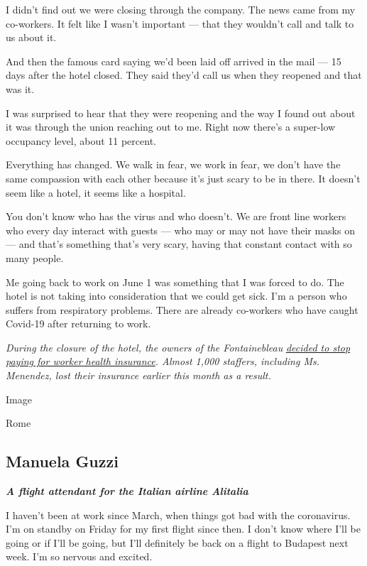 I didn't find out we were closing through the company. The news came
from my co-workers. It felt like I wasn't important --- that they
wouldn't call and talk to us about it.

And then the famous card saying we'd been laid off arrived in the mail
--- 15 days after the hotel closed. They said they'd call us when they
reopened and that was it.

I was surprised to hear that they were reopening and the way I found out
about it was through the union reaching out to me. Right now there's a
super-low occupancy level, about 11 percent.

Everything has changed. We walk in fear, we work in fear, we don't have
the same compassion with each other because it's just scary to be in
there. It doesn't seem like a hotel, it seems like a hospital.

You don't know who has the virus and who doesn't. We are front line
workers who every day interact with guests --- who may or may not have
their masks on --- and that's something that's very scary, having that
constant contact with so many people.

Me going back to work on June 1 was something that I was forced to do.
The hotel is not taking into consideration that we could get sick. I'm a
person who suffers from respiratory problems. There are already
co-workers who have caught Covid-19 after returning to work.

\emph{During the closure of the hotel, the owners of the Fontainebleau}
\href{https://www.miamiherald.com/news/business/tourism-cruises/article243908132.html}{\emph{decided
to stop paying for worker health insurance}}\emph{. Almost 1,000
staffers, including Ms. Menendez, lost their insurance earlier this
month as a result.}

Image

Rome

\hypertarget{manuela-guzzi}{%
\subsection{Manuela Guzzi}\label{manuela-guzzi}}

\emph{\textbf{A flight attendant for the Italian airline Alitalia}}

I haven't been at work since March, when things got bad with the
coronavirus. I'm on standby on Friday for my first flight since then. I
don't know where I'll be going or if I'll be going, but I'll definitely
be back on a flight to Budapest next week. I'm so nervous and excited.

